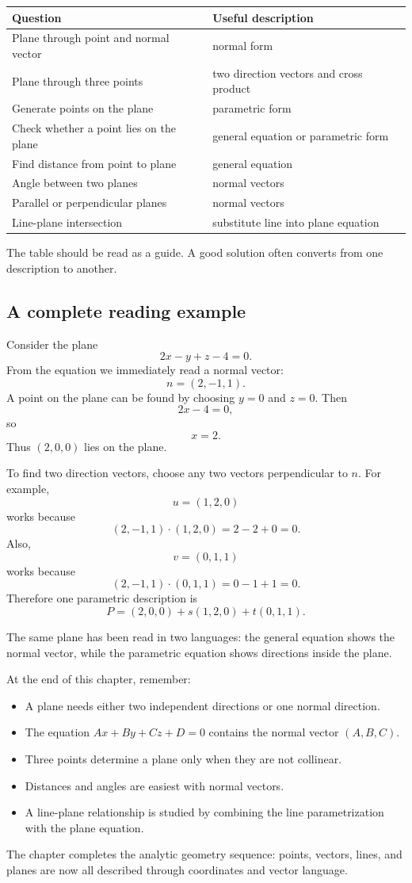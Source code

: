 \begin{center}
\begin{tabular}{ll}
\toprule
Question & Useful description \\
\midrule
Plane through point and normal vector & normal form \\
Plane through three points & two direction vectors and cross product \\
Generate points on the plane & parametric form \\
Check whether a point lies on the plane & general equation or parametric form \\
Find distance from point to plane & general equation \\
Angle between two planes & normal vectors \\
Parallel or perpendicular planes & normal vectors \\
Line-plane intersection & substitute line into plane equation \\
\bottomrule
\end{tabular}
\end{center}

The table should be read as a guide. A good solution often converts from one description to another.

\subsection*{A complete reading example}

Consider the plane
\[
2x-y+z-4=0.
\]
From the equation we immediately read a normal vector:
\[
n=(2,-1,1).
\]
A point on the plane can be found by choosing \(y=0\) and \(z=0\). Then
\[
2x-4=0,
\]
so
\[
x=2.
\]
Thus \((2,0,0)\) lies on the plane.

To find two direction vectors, choose any two vectors perpendicular to \(n\). For example,
\[
u=(1,2,0)
\]
works because
\[
(2,-1,1)\cdot(1,2,0)=2-2+0=0.
\]
Also,
\[
v=(0,1,1)
\]
works because
\[
(2,-1,1)\cdot(0,1,1)=0-1+1=0.
\]
Therefore one parametric description is
\[
P=(2,0,0)+s(1,2,0)+t(0,1,1).
\]

The same plane has been read in two languages: the general equation shows the normal vector, while the parametric equation shows directions inside the plane.

\begin{summarybox}
At the end of this chapter, remember:
\begin{itemize}
\item A plane needs either two independent directions or one normal direction.
\item The equation \(Ax+By+Cz+D=0\) contains the normal vector \((A,B,C)\).
\item Three points determine a plane only when they are not collinear.
\item Distances and angles are easiest with normal vectors.
\item A line-plane relationship is studied by combining the line parametrization with the plane equation.
\end{itemize}
\end{summarybox}

The chapter completes the analytic geometry sequence: points, vectors, lines, and planes are now all described through coordinates and vector language.
